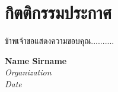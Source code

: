 \chapter*{กิตติกรรมประกาศ}

ข้าพเจ้าขอแสดงความขอบคุณ..........

\begin{flushright}
\textbf{Name Sirname} \\
\textit{Organization} \\
\textit{Date}
\end{flushright}
